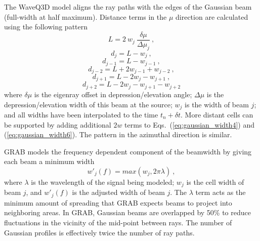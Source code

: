 \documentclass{ws-jca}
\begin{document}
The WaveQ3D model aligns the ray paths with the edges of the Gaussian beam (full-width at half maximum).  Distance terms in the \(\mu\) direction are calculated using the following pattern
\begin{equation}
	L = 2 \: w_j \: \frac{\delta \mu}{\Delta \mu_j} \:,
	\label{eq:gaussian_width1}
\end{equation}
\begin{equation}
	d_j = L - w_j \:,
	\label{eq:gaussian_width2}
\end{equation}
\begin{equation}
	d_{j-1} = L - w_{j-1} \:,
	\label{eq:gaussian_width3}
\end{equation}
\begin{equation}
	d_{j-2} = L + 2 w_{j-1} + w_{j-2} \:,
	\label{eq:gaussian_width4}
\end{equation}
\begin{equation}
	d_{j+1} = L - 2 w_j - w_{j+1} \:,
	\label{eq:gaussian_width5}
\end{equation}
\begin{equation}
	d_{j+2} = L - 2 w_j - w_{j+1} - w_{j+2}
	\label{eq:gaussian_width6}
\end{equation}
where
\(\delta \mu\) is the eigenray offset in depression/elevation angle;
\(\Delta \mu\) is the depression/elevation width of this beam at the source;
\(w_j\) is the width of beam $j$;
and all widths have been interpolated to the time \(t_n+\delta t\).
More distant cells can be supported by adding additional $2w$ terms to
Eqs.~(\ref{eq:gaussian_width4}) and (\ref{eq:gaussian_width6}). The pattern
in the azimuthal direction is similar.

GRAB\cite{Weinberg1996} models the frequency dependent component of the
beamwidth by giving each beam a minimum width
\begin{equation}
  w'_j(f) = max \left( w_j, 2 \pi \lambda \right) \:, 
  \label{eq:weinberg_width}
\end{equation}
where 
\(\lambda\) is the wavelength of the signal being modeled;
\(w_j\) is the cell width of beam $j$, and
\(w'_j(f)\) is the adjusted width of beam $j$.
The \(\lambda\) term acts as the minimum amount of spreading that GRAB expects beams to project into neighboring areas.  In GRAB, Gaussian beams are overlapped by 50\% to reduce fluctuations in the vicinity of the mid-point between rays.\cite{Weinberg1996b}  The number of Gaussian profiles is effectively twice the number of ray paths. 
\end{document}
